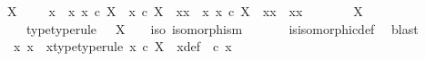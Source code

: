 \begin{isabellebody}
{\isachardoublequoteopen}{\isacharparenleft}{\kern0pt}X\ {\isasymcong}\ {\isasymOmega}{\isacharparenright}{\kern0pt}\ {\isacharequal}{\kern0pt}\ {\isacharparenleft}{\kern0pt}{\isasymexists}\ x{}{\isachardot}{\kern0pt}\ {\isacharparenleft}{\kern0pt}{\isasymexists}\ x{}{\isachardot}{\kern0pt}\ {\isacharparenleft}{\kern0pt}{\isacharparenleft}{\kern0pt}x{}\ {\isasymin}\isactrlsub c\ X{\isacharparenright}{\kern0pt}\ {\isasymand}\ {\isacharparenleft}{\kern0pt}x{}\ {\isasymin}\isactrlsub c\ X{\isacharparenright}{\kern0pt}\ {\isasymand}\ {\isacharparenleft}{\kern0pt}x{}{\isasymnoteq}x{}{\isacharparenright}{\kern0pt}\ {\isasymand}\ {\isacharparenleft}{\kern0pt}{\isasymforall}x{\isachardot}{\kern0pt}\ x\ {\isasymin}\isactrlsub c\ X\ {\isasymlongrightarrow}\ {\isacharparenleft}{\kern0pt}x{\isacharequal}{\kern0pt}x{}{\isacharparenright}{\kern0pt}\ {\isasymor}\ {\isacharparenleft}{\kern0pt}x{\isacharequal}{\kern0pt}x{}{\isacharparenright}{\kern0pt}{\isacharparenright}{\kern0pt}\ \ {\isacharparenright}{\kern0pt}{\isacharparenright}{\kern0pt}{\isacharparenright}{\kern0pt}{\isachardoublequoteclose}\isanewline
%
\isadelimproof
%
\endisadelimproof
%
\isatagproof
{}\isamarkupfalse%
\ \isanewline
\ \ \isamarkupfalse%
\ {\isachardoublequoteopen}X\ {\isasymcong}\ {\isasymOmega}{\isachardoublequoteclose}\isanewline
\ \ \isamarkupfalse%
\ \isamarkupfalse%
\ {\isasymphi}\ \ {\isasymphi}{\isacharunderscore}{\kern0pt}type{\isacharbrackleft}{\kern0pt}type{\isacharunderscore}{\kern0pt}rule{\isacharbrackright}{\kern0pt}{\isacharcolon}{\kern0pt}\ {\isachardoublequoteopen}{\isasymphi}\ {\isacharcolon}{\kern0pt}\ X\ {\isasymrightarrow}\ {\isasymOmega}{\isachardoublequoteclose}\ \ {\isasymphi}{\isacharunderscore}{\kern0pt}iso{\isacharcolon}{\kern0pt}\ {\isachardoublequoteopen}isomorphism\ {\isasymphi}{\isachardoublequoteclose}\isanewline
\ \ \ \ \isamarkupfalse%
\ is{\isacharunderscore}{\kern0pt}isomorphic{\isacharunderscore}{\kern0pt}def\ \isamarkupfalse%
\ blast\isanewline
\ \ \isamarkupfalse%
\ x{}\ x{}\ \ x{}{\isacharunderscore}{\kern0pt}type{\isacharbrackleft}{\kern0pt}type{\isacharunderscore}{\kern0pt}rule{\isacharbrackright}{\kern0pt}{\isacharcolon}{\kern0pt}\ {\isachardoublequoteopen}x{}\ {\isasymin}\isactrlsub c\ X{\isachardoublequoteclose}\ \ x{}{\isacharunderscore}{\kern0pt}def{\isacharcolon}{\kern0pt}\ {\isachardoublequoteopen}{\isasymphi}\ {\isasymcirc}\isactrlsub c\ x{}\ {\isacharequal}{\kern0pt}\ {\isasymt}{\isachardoublequoteclose}\ \isanewline

\end{isabellebody}
